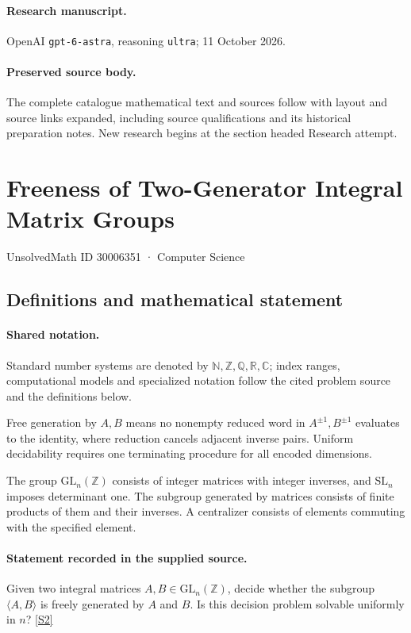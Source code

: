 \documentclass[11pt]{article}
\begin{document}
\paragraph{Research manuscript.} OpenAI \texttt{gpt-6-astra}, reasoning \texttt{ultra}; 11 October 2026.
\paragraph{Preserved source body.} The complete catalogue mathematical text and sources follow with layout and source links expanded, including source qualifications and its historical preparation notes. New research begins at the section headed Research attempt.

\section{Freeness of Two-Generator Integral Matrix Groups}\label{30006351}
{\small UnsolvedMath ID 30006351 · Computer Science}
\subsection{Definitions and mathematical statement}

\paragraph{Shared notation.}Standard number systems are denoted by $\mathbb N,\mathbb Z,\mathbb Q,\mathbb R,\mathbb C$; index ranges, computational models and specialized notation follow the cited problem source and the definitions below.


Free generation by $A,B$ means no nonempty reduced word in $A^{\pm1},B^{\pm1}$ evaluates to the identity, where reduction cancels adjacent inverse pairs. Uniform decidability requires one terminating procedure for all encoded dimensions.

The group $\mathrm{GL}_n(\mathbb Z)$ consists of integer matrices with integer inverses, and $\mathrm{SL}_n$ imposes determinant one. The subgroup generated by matrices consists of finite products of them and their inverses. A centralizer consists of elements commuting with the specified element.
\paragraph{Statement recorded in the supplied source.}
Given two integral matrices $A,B\in\mathrm{GL}_n(\mathbb{Z})$, decide whether the subgroup $\langle A,B\rangle$ is freely generated by $A$ and $B$. Is this decision problem solvable uniformly in $n$? \href{https://doi.org/10.4171/owr/2025/27}{[S2]}
\end{document}
